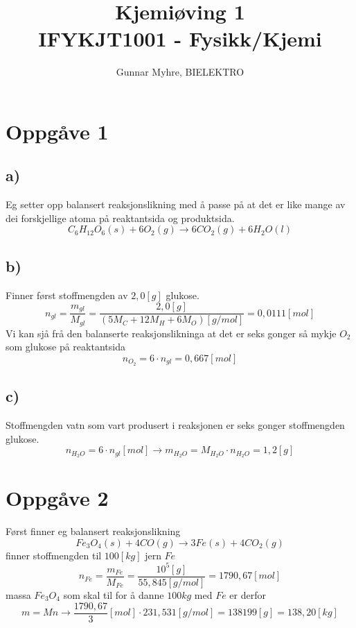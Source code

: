 \documentclass[12pt,a4paper]{article}
\title{%
  Kjemiøving 1 \\
  \large IFYKJT1001 - Fysikk/Kjemi \\
  }
\author{Gunnar Myhre, BIELEKTRO}
\begin{document}
  \maketitle

  \section*{Oppgåve 1}
    \subsection*{a)}
    Eg setter opp balansert reaksjonslikning med å passe på at det er like mange av
    dei forskjellige atoma på reaktantsida og produktsida.
    \begin{equation}
      C_6H_{12}O_6(s) + 6O_2(g) \longrightarrow 6CO_2(g) + 6H_2O(l)
    \end{equation}

    \subsection*{b)}
    Finner først stoffmengden av $2,0[g]$ glukose.
    \begin{equation}
      n_{gl} = \frac{m_{gl}}{M_{gl}} = \frac{2,0[g]}{(5M_C + 12M_H + 6M_O)[g/mol]} = 0,0111[mol]
    \end{equation}
    Vi kan sjå frå den balanserte reaksjonslikninga at det er seks gonger så mykje $O_2$ som
    glukose på reaktantsida
    \begin{equation}
      n_{O_2} = 6\cdot n_{gl} = 0,667[mol]
    \end{equation}

    \subsection*{c)}
    Stoffmengden vatn som vart produsert i reaksjonen er seks gonger stoffmengden glukose.
    \begin{equation}
      n_{H_2O} = 6\cdot n_{gl} [mol] \rightarrow m_{H_2O} = M_{H_2O}\cdot n_{H_2O} = 1,2[g]
    \end{equation}


  \section*{Oppgåve 2}
    Først finner eg balansert reaksjonslikning
    \begin{equation}
      Fe_3O_4(s) + 4CO(g) \longrightarrow 3Fe(s) + 4CO_2(g)
    \end{equation}
    finner stoffmengden til $100[kg]$ jern $Fe$
    \begin{equation}
      n_{Fe} = \frac{m_{Fe}}{M_{Fe}} = \frac{10^5[g]}{55,845[g/mol]} = 1790,67[mol]
    \end{equation}
    massa $Fe_3O_4$ som skal til for å danne $100 kg$ med $Fe$ er derfor
    \begin{equation}
      m = Mn \rightarrow
      \frac{1790,67}{3}[mol] \cdot 231,531[g/mol]
      = 138199 [g] = 138,20 [kg]
    \end{equation}
\end{document}
